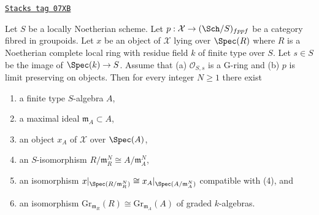 \begin{lemma}[Approximate]
\label{artin-lemma-approximate}
\href{https://stacks.math.columbia.edu/tag/07XB}{\texttt{Stacks tag 07XB}}

Let $S$ be a locally Noetherian scheme. Let
$p : \mathcal{X} \to (\Sch/S)_{fppf}$ be a category
fibred in groupoids. Let $x$ be an object of
$\mathcal{X}$ lying over $\Spec(R)$ where $R$ is a Noetherian complete
local ring with residue field $k$ of finite type over $S$. Let $s \in S$
be the image of $\Spec(k) \to S$. Assume that (a) $\mathcal{O}_{S, s}$ is
a G-ring and (b) $p$ is limit preserving on objects. Then for every
integer $N \geq 1$ there exist
\begin{enumerate}
\item a finite type $S$-algebra $A$,
\item a maximal ideal $\mathfrak m_A \subset A$,
\item an object $x_A$ of $\mathcal{X}$ over $\Spec(A)$,
\item an $S$-isomorphism $R/\mathfrak m_R^N \cong A/\mathfrak m_A^N$,
\item an isomorphism
$x|_{\Spec(R/\mathfrak m_R^N)} \cong x_A|_{\Spec(A/\mathfrak m_A^N)}$
compatible with (4), and
\item an isomorphism
$\text{Gr}_{\mathfrak m_R}(R) \cong \text{Gr}_{\mathfrak m_A}(A)$
of graded $k$-algebras.
\end{enumerate}
\end{lemma}

